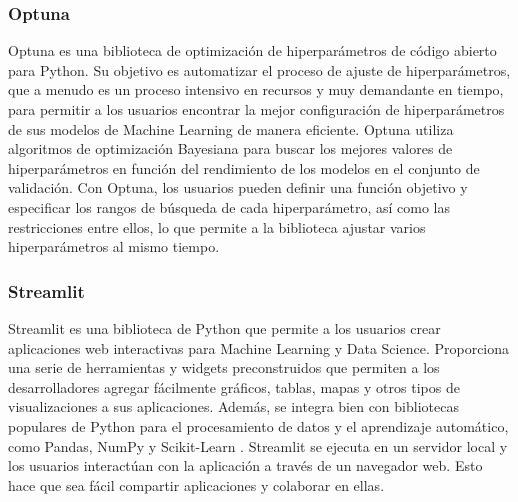\subsubsection{Optuna}
Optuna \cite{optuna_2019} es una biblioteca de optimización de hiperparámetros de código abierto para Python. Su objetivo 
es automatizar el proceso de ajuste de hiperparámetros, que a menudo es un proceso intensivo en 
recursos y muy demandante en tiempo, para permitir a los usuarios encontrar la mejor configuración 
de hiperparámetros de sus modelos de Machine Learning de manera eficiente. Optuna utiliza algoritmos 
de optimización Bayesiana \cite{Ye_2020} para buscar los mejores valores de hiperparámetros en función del 
rendimiento de los modelos en el conjunto de validación. Con Optuna, los usuarios pueden definir una función 
objetivo y especificar los rangos de búsqueda de cada hiperparámetro, así como las restricciones entre ellos, 
lo que permite a la biblioteca ajustar varios hiperparámetros al mismo tiempo.

\subsubsection{Streamlit}
Streamlit \cite{Streamlit} es una biblioteca de Python que permite a los usuarios crear aplicaciones web interactivas
para Machine Learning y Data Science. Proporciona una serie de herramientas y widgets preconstruidos 
que permiten a los desarrolladores agregar fácilmente gráficos, tablas, mapas y otros tipos de 
visualizaciones a sus aplicaciones. Además, se integra bien con bibliotecas populares de Python 
para el procesamiento de datos y el aprendizaje automático, como Pandas, NumPy y Scikit-Learn \cite{scikit-learn}.
Streamlit se ejecuta en un servidor local y los usuarios interactúan con la aplicación a través 
de un navegador web. Esto hace que sea fácil compartir aplicaciones y colaborar en ellas.